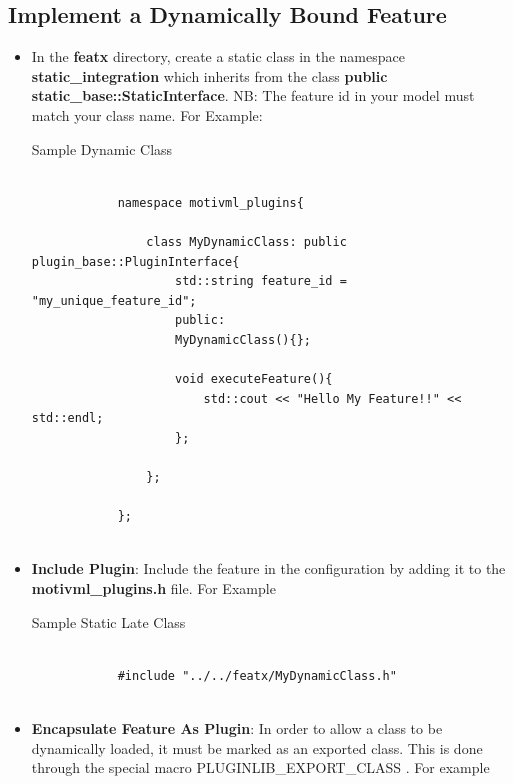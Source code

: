 \documentclass{article}
\newenvironment{longlisting}{\captionsetup{type=listing}}{}
\begin{document}
\subsection{Implement a Dynamically Bound Feature}
\begin{itemize}
	\item In the \textbf{featx} directory, create a static class in the namespace \textbf{static\_integration} which inherits from the class \textbf{public static\_base::StaticInterface}. NB: The feature id in your model must match your class name. For Example:
	
	\begin{longlisting}
		\caption{Sample Dynamic Class}
		\begin{verbatim}
			
			namespace motivml_plugins{
				
				class MyDynamicClass: public plugin_base::PluginInterface{
					std::string feature_id = "my_unique_feature_id";
					public:
					MyDynamicClass(){};
					
					void executeFeature(){
						std::cout << "Hello My Feature!!" << std::endl;
					};
					
				};
				
			};
			
		\end{verbatim}
		\label{samplestaticlate}
	\end{longlisting}

	\item \textbf{Include Plugin}: Include the feature in the configuration by adding it to the \textbf{motivml\_plugins.h} file. For Example
	
	\begin{longlisting}
		\caption{Sample Static Late Class}
		\begin{verbatim}
			
			#include "../../featx/MyDynamicClass.h"
			
		\end{verbatim}
		\label{sampstaticlateinclude}
	\end{longlisting}

	\item \textbf{Encapsulate Feature As Plugin}: In order to allow a class to be dynamically loaded, it must be marked as an exported class. This is done through the special macro PLUGINLIB\_EXPORT\_CLASS  \cite{pluginlib}. For example
	

\end{itemize}
\end{document}
